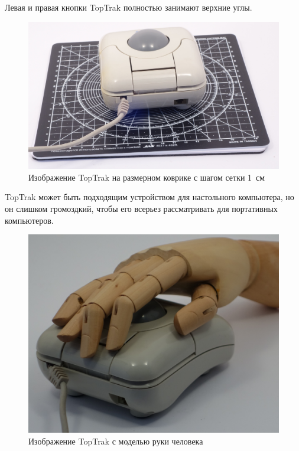 \documentclass[11pt, a4paper]{article}
\begin{document}

Левая и правая кнопки TopTrak полностью занимают верхние углы.

\begin{figure}[h]
    \centering
    \includegraphics[scale=0.35]{1990_kraft_toptrack/2.6.jpg}
    \caption{Изображение TopTrak на размерном коврике с шагом сетки 1~см}
    \label{fig:TopTrakSize}
\end{figure}


TopTrak может быть подходящим устройством для настольного компьютера, но он слишком громоздкий, чтобы его всерьез рассматривать для портативных компьютеров.

\begin{figure}[h]
    \centering
    \includegraphics[scale=0.45]{1990_kraft_toptrack/2.5.jpg}
    \caption{Изображение TopTrak с моделью руки человека}
    \label{fig:TopTrakHand}
\end{figure}
\end{document}
